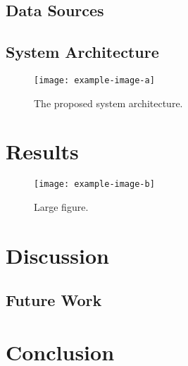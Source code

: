 \documentclass[conference]{IEEEtran}
\begin{document}
\subsection{Data Sources}
\par \blindtext

\subsection{System Architecture}
\par \blindtext



\begin{figure}[h!]
\centering
\texttt{[image: example-image-a]}
\caption{The proposed system architecture.}
\end{figure}


\section{Results}
\par \blindtext


\begin{figure*}[h!]
\centering
\texttt{[image: example-image-b]}
\caption{Large figure.}
\end{figure*}


\section{Discussion}
\subsection{Future Work}
\par \blindtext

\section{Conclusion}
\par \blindtext



\nocite{*}


\end{document}
